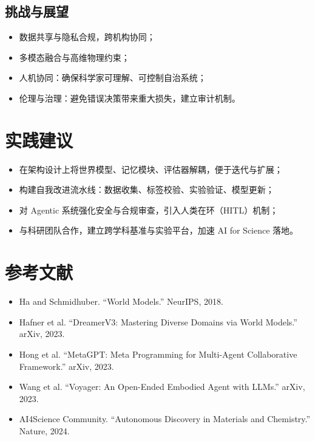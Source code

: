 \documentclass[UTF8,zihao=-4]{ctexart}
\begin{document}
\subsection{挑战与展望}
\begin{itemize}
  \item 数据共享与隐私合规，跨机构协同；
  \item 多模态融合与高维物理约束；
  \item 人机协同：确保科学家可理解、可控制自治系统；
  \item 伦理与治理：避免错误决策带来重大损失，建立审计机制。
\end{itemize}

\section*{实践建议}
\begin{itemize}
  \item 在架构设计上将世界模型、记忆模块、评估器解耦，便于迭代与扩展；
  \item 构建自我改进流水线：数据收集、标签校验、实验验证、模型更新；
  \item 对 Agentic 系统强化安全与合规审查，引入人类在环（HITL）机制；
  \item 与科研团队合作，建立跨学科基准与实验平台，加速 AI for Science 落地。
\end{itemize}

\section*{参考文献}
\begin{itemize}
  \item Ha and Schmidhuber. ``World Models.'' NeurIPS, 2018.
  \item Hafner et al. ``DreamerV3: Mastering Diverse Domains via World Models.'' arXiv, 2023.
  \item Hong et al. ``MetaGPT: Meta Programming for Multi-Agent Collaborative Framework.'' arXiv, 2023.
  \item Wang et al. ``Voyager: An Open-Ended Embodied Agent with LLMs.'' arXiv, 2023.
  \item AI4Science Community. ``Autonomous Discovery in Materials and Chemistry.'' Nature, 2024.
\end{itemize}
\end{document}
